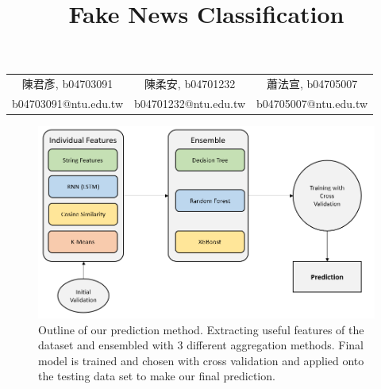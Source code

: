\documentclass[a4paper, 12pt]{article}
\author{}
\title{\textbf{Fake News Classification}}
\begin{document}
    \maketitle     
    \begin{center}
        \begin{tabular}{ccc}
            陳君彥, b04703091 & 陳柔安, b04701232 & 蕭法宣, b04705007 \\
            b04703091@ntu.edu.tw &
            b04701232@ntu.edu.tw &
            b04705007@ntu.edu.tw
        \end{tabular}
    \end{center}

    \begin{figure}[h!]
        \includegraphics[width=\linewidth]{images/outline.png}
        \caption{Outline of our prediction method. Extracting useful features of the dataset and ensembled with 3 different aggregation methods. Final model is trained and chosen with cross validation and applied onto the testing data set to make our final prediction.}
        \label{outline}
    \end{figure}
\end{document}
